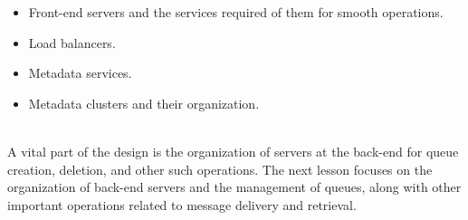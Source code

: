 \begin{itemize}
\item
\protect{}\label{ofvNEeeeStEOGvaaI6_ni}
Front-end servers and the services required of them for smooth operations.
\item
\protect{}\label{sc8qIcncWFdl5DtJvrkcJ}
Load balancers.
\item
\protect{}\label{wZzLazt7gHC9z9wmFNToN}
Metadata services.
\item
\protect{}\label{t2meB6wsMddczM3R4i2tE}
Metadata clusters and their organization.
\end{itemize}
\\
A vital part of the design is the organization of servers at the back-end for queue creation, deletion, and other such operations. The next lesson focuses on the organization of back-end servers and the management of queues, along with other important operations related to message delivery and retrieval.

